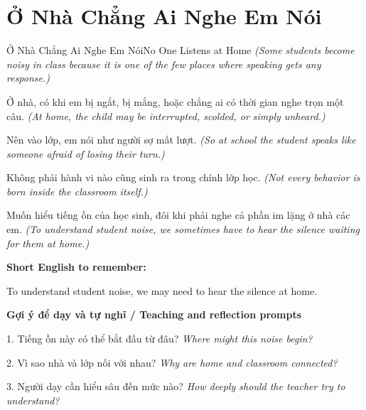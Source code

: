 \section{Ở Nhà Chẳng Ai Nghe Em Nói}
\begin{truyen}{Ở Nhà Chẳng Ai Nghe Em Nói}{No One Listens at Home}
\textit{(Some students become noisy in class because it is one of the few places where speaking gets any response.)}

Ở nhà, có khi em bị ngắt, bị mắng, hoặc chẳng ai có thời gian nghe trọn một câu.
\textit{(At home, the child may be interrupted, scolded, or simply unheard.)}

Nên vào lớp, em nói như người sợ mất lượt.
\textit{(So at school the student speaks like someone afraid of losing their turn.)}

Không phải hành vi nào cũng sinh ra trong chính lớp học.
\textit{(Not every behavior is born inside the classroom itself.)}

\end{truyen}

\begin{baihoc}
Muốn hiểu tiếng ồn của học sinh, đôi khi phải nghe cả phần im lặng ở nhà các em.
\textit{(To understand student noise, we sometimes have to hear the silence waiting for them at home.)}
\end{baihoc}

\begin{ghinhoanh}
\textbf{Short English to remember:}

To understand student noise, we may need to hear the silence at home.

\end{ghinhoanh}

\begin{tuhocnhanh}
\textbf{Gợi ý để dạy và tự nghĩ / Teaching and reflection prompts}

1. Tiếng ồn này có thể bắt đầu từ đâu? \textit{Where might this noise begin?}

2. Vì sao nhà và lớp nối với nhau? \textit{Why are home and classroom connected?}

3. Người dạy cần hiểu sâu đến mức nào? \textit{How deeply should the teacher try to understand?}
\end{tuhocnhanh}
\ngancach

